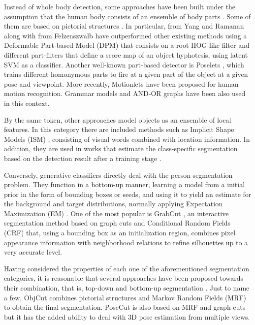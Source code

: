 \documentclass[10pt,twocolumn,letterpaper]{article}
\begin{document}
Instead of whole body detection, some approaches have been built under the assumption that the human body consists of an ensemble of body parts \cite{ramanan2006learning, pirsiavash2012steerable}. Some of them are based on pictorial structures \cite{andriluka2009pictorial, yang2011articulated}. In particular, \cite{yang2011articulated, yang2012articulated} from Yang and Ramanan along with \cite{felzenszwalb2010object} from Felzenszwalb have outperformed other existing methods using a Deformable Part-based Model (DPM) that consists on a root HOG-like filter and different part-filters that define a score map of an object hyphotesis, using latent SVM as a classifier. Another well-known part-based detector is Poselets \cite{bourdev2009poselets, wang2011learning}, which trains different homonymous parts to fire at a given part of the object at a given pose and viewpoint. More recently, Motionlets \cite{wang2013motionlets} have been proposed for human motion recognition. Grammar models \cite{girshick2011object} and AND-OR graphs \cite{zhu2008max} have been also used in this context.

By the same token, other approaches model objects as an ensemble of local features. In this category there are included methods such as Implicit Shape Models (ISM) \cite{leibe2004combined}, consisting of visual words combined with location information. In addition, they are used in works that estimate the class-specific segmentation based on the detection result after a training stage \cite{leibe2008robust}.  

Conversely, generative classifiers directly deal with the person segmentation problem. They function in a bottom-up manner, learning a model from a initial prior in the form of bounding boxes or seeds, and using it to yield an estimate for the background and target distributions, normally applying Expectation Maximization (EM) \cite{shi2000normalized, carson2002blobworld}. One of the most popular is GrabCut \cite{rother2004grabcut, gulshan2011humanising}, an interactive segmentation method based on graph cuts \cite{boykov2001interactive} and Conditional Random Fields (CRF) that, using a bounding box as an initialization region, combines pixel appearance information with neighborhood relations to refine silhouettes up to a very accurate level. 
 
Having considered the properties of each one of the aforementioned segmentation categories, it is reasonable that several approaches have been proposed towards their combination, that is, top-down and bottom-up segmentation \cite{lin2007interactive, mori2004recovering, ladicky2010and, levin2006learning, fidler2013bottom}. Just to name a few, ObjCut \cite{kumar2005obj} combines pictorial structures and Markov Random Fields (MRF) to obtain the final segmentation. PoseCut \cite{bray2006posecut} is also based on MRF and graph cuts but it has the added ability to deal with 3D pose estimation from multiple views.
 
\end{document}
